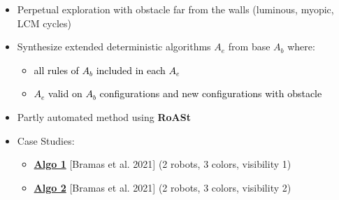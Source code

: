 \begin{frame}{}

\begin{itemize}\setlength\itemsep{0.25cm}
  \item<1-> Perpetual exploration with obstacle far from the walls (luminous, myopic, LCM cycles)
  
  \item<2-> Synthesize extended deterministic algorithms $A_e$ from base $A_b$ where:
        \begin{itemize}\setlength\itemsep{0.1cm}
            \item<3->[\textcolor{accent}{\scriptsize$\hookrightarrow$}] \textcolor{black}{all rules of $A_b$ included in each $A_e$}
            \item<4->[\textcolor{accent}{\scriptsize$\hookrightarrow$}] \textcolor{black}{$A_e$ valid on $A_b$ configurations and new configurations with obstacle}
        \end{itemize}
  \item<5-> Partly automated method using \textbf{RoASt}
  
  \item<6-> Case Studies:
        \begin{itemize}\setlength\itemsep{0.1cm}
            \item<6->[\textcolor{accent}{\scriptsize$\hookrightarrow$}] \href{https://bramas.fr/static/ICDCN2021/2-robots-3-colors-range-1.html}{\textcolor{accent}{\textbf{Algo 1}}} \textcolor{softgray}{\scriptsize [Bramas et al. 2021]} \quad (2 robots, 3 colors, visibility 1)
            \item<6->[\textcolor{accent}{\scriptsize$\hookrightarrow$}] \href{https://bramas.fr/static/ICDCN2021/2-robots-2-colors-range-2.html}{\textcolor{accent}{\textbf{Algo 2}}} \textcolor{softgray}{\scriptsize [Bramas et al. 2021]} \quad (2 robots, 3 colors, visibility 2)
        \end{itemize}
\end{itemize}

\end{frame}
